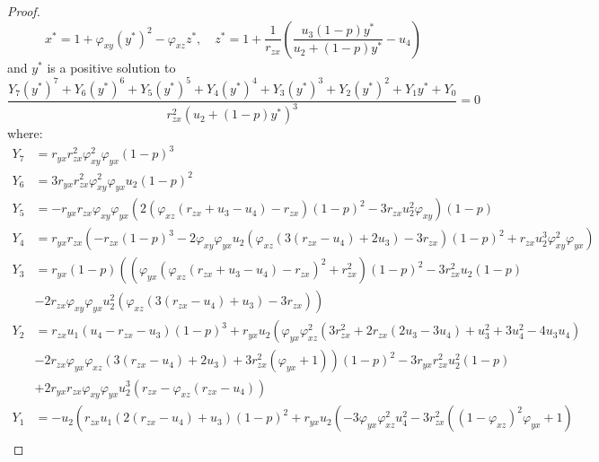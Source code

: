 \begin{proof}
    \begin{equation*}
        x^*=1+\varphi_{xy}\left(y^*\right)^2-\varphi_{xz}z^*,\quad 
        z^*=1+\frac{1}{r_{zx}}\left(\frac{u_3\left(1-p\right)y^*}{u_2+\left(1-p\right)y^*}-u_4\right)
    \end{equation*}
    and $y^*$ is a positive solution to 
    \begin{equation*}
        \frac{Y_7\left(y^*\right)^7+Y_6\left(y^*\right)^6+Y_5\left(y^*\right)^5+Y_4\left(y^*\right)^4+Y_3\left(y^*\right)^3+Y_2\left(y^*\right)^2+Y_1y^*+Y_0}{r_{zx}^2\left(u_2+\left(1-p\right)y^*\right)^3}=0
    \end{equation*}
    where:
    \begin{align*}
        Y_7 &= r_{yx}r_{zx}^2\varphi_{xy}^2\varphi_{yx}\left(1-p\right)^3\\
        Y_6 &= 3r_{yx}r_{zx}^2\varphi_{xy}^2\varphi_{yx}u_2\left(1-p\right)^2\\
        Y_5 &= -r_{yx}r_{zx}\varphi_{xy}\varphi_{yx}\left(2\left(\varphi_{xz}\left(r_{zx}+u_3-u_4\right)-r_{zx}\right)\left(1-p\right)^2-3r_{zx}u_2^2\varphi_{xy}\right)\left(1-p\right)\\
        Y_4 &= r_{yx}r_{zx}\left(-r_{zx}\left(1-p\right)^3-2\varphi_{xy}\varphi_{yx}u_2\left(\varphi_{xz}\left(3\left(r_{zx}-u_4\right)+2u_3\right)-3r_{zx}\right)\left(1-p\right)^2+r_{zx}u_2^3\varphi_{xy}^2\varphi_{yx}\right)\\
        Y_3 &= r_{yx}\left(1-p\right)\left(\left(\varphi_{yx}\left(\varphi_{xz}\left(r_{zx}+u_3-u_4\right)-r_{zx}\right)^2+r_{zx}^2\right)\left(1-p\right)^2-3r_{zx}^2u_2\left(1-p\right)\right.\\
        &\left.-2r_{zx}\varphi_{xy}\varphi_{yx}u_2^2\left(\varphi_{xz}\left(3\left(r_{zx}-u_4\right)+u_3\right)-3r_{zx}\right)\right)\\
        Y_2 &= r_{zx}u_1\left(u_4-r_{zx}-u_3\right)\left(1-p\right)^3+r_{yx}u_2\left(\varphi_{yx}\varphi_{xz}^2\left(3r_{zx}^2+2r_{zx}\left(2u_3-3u_4\right)+u_3^2+3u_4^2-4u_3u_4\right)\right.\\
        &\left.-2r_{zx}\varphi_{yx}\varphi_{xz}\left(3\left(r_{zx}-u_4\right)+2u_3\right)+3r_{zx}^2\left(\varphi_{yx}+1\right)\right)\left(1-p\right)^2-3r_{yx}r_{zx}^2u_2^2\left(1-p\right)\\
        &+2r_{yx}r_{zx}\varphi_{xy}\varphi_{yx}u_2^3\left(r_{zx}-\varphi_{xz}\left(r_{zx}-u_4\right)\right)\\
        Y_1 &= -u_2\left(r_{zx}u_1\left(2\left(r_{zx}-u_4\right)+u_3\right)\left(1-p\right)^2+r_{yx}u_2\left(-3\varphi_{yx}\varphi_{xz}^2u_4^2-3r_{zx}^2\left(\left(1-\varphi_{xz}\right)^2\varphi_{yx}+1\right)\right.\right.\\

\end{align*}
\end{proof}

